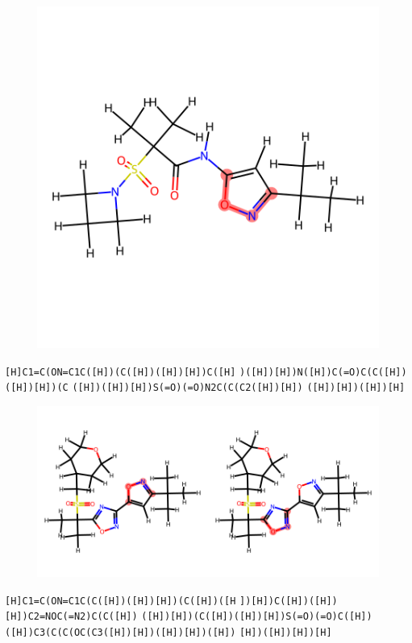 \documentclass{article}
\begin{document}
\begin{figure}[ht]
\centering
    \includegraphics{mol244.png}
\end{figure}
\verb|[H]C1=C(ON=C1C([H])(C([H])([H])[H])C([H]| \verb|)([H])[H])N([H])C(=O)C(C([H])([H])[H])(C| \verb|([H])([H])[H])S(=O)(=O)N2C(C(C2([H])[H])| \verb|([H])[H])([H])[H]|

\begin{figure}[ht]
\centering
    \includegraphics{mol245.png}
\end{figure}
\verb|[H]C1=C(ON=C1C(C([H])([H])[H])(C([H])([H| \verb|])[H])C([H])([H])[H])C2=NOC(=N2)C(C([H])| \verb|([H])[H])(C([H])([H])[H])S(=O)(=O)C([H])| \verb|([H])C3(C(C(OC(C3([H])[H])([H])[H])([H])| \verb|[H])([H])[H])[H]|
\end{document}
